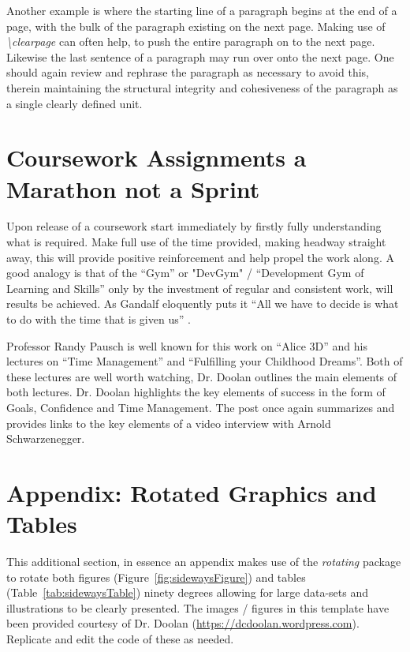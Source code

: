 Another example is where the starting line of a paragraph begins at the end of a page, with the bulk of the paragraph existing on the next page. Making use of \emph{\textbackslash clearpage} can often help, to push the entire paragraph on to the next page. Likewise the last sentence of a paragraph may run over onto the next page. One should again review and rephrase the paragraph as necessary to avoid this, therein maintaining the structural integrity and cohesiveness of the paragraph as a single clearly defined unit. 



\section{Coursework Assignments a Marathon not a Sprint}
Upon release of a coursework start immediately by firstly fully understanding what is required. Make full use of the time provided, making headway straight away, this will provide positive reinforcement and help propel the work along. A good analogy is that of the ``Gym'' or "DevGym" / ``Development Gym of Learning and Skills'' only by the investment of regular and consistent work, will results be achieved. As Gandalf eloquently puts it ``All we have to decide is what to do with the time that is given us'' \cite{book:Tolkien:1991:FOTR}\cite{online:Jackson:2001:FOTR}. 

Professor Randy Pausch is well known for this work on ``Alice 3D'' and his lectures on ``Time Management'' and ``Fulfilling your Childhood Dreams''. Both of these lectures are well worth watching, Dr. Doolan \cite{online:Doolan:2015:PauschLecture} outlines the main elements of both lectures. Dr. Doolan \cite{online:Doolan:2016:SchwarzeneggerInterview} highlights the key elements of success in the form of Goals, Confidence and Time Management. The post once again summarizes and provides links to the key elements of a video interview with Arnold Schwarzenegger. 

\section{Appendix: Rotated Graphics and Tables}
This additional section, in essence an appendix makes use of the \emph{rotating} package to rotate both figures (Figure~\ref{fig:sidewaysFigure}) and tables (Table~\ref{tab:sidewaysTable}) ninety degrees allowing for large data-sets and illustrations to be clearly presented. The images / figures in this template have been provided courtesy of Dr. Doolan (\url{https://dcdoolan.wordpress.com}). Replicate and edit the code of these as needed. 

